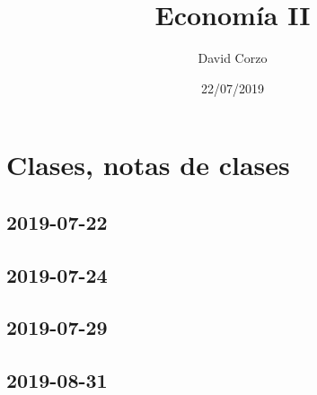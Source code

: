 \documentclass{book}
\author{David Corzo}
\date{22/07/2019}
\title{Economía II}
\begin{document}
\maketitle
\tableofcontents

\part{Clases, notas de clases}

\chapter{2019-07-22}


\chapter{2019-07-24}


\chapter{2019-07-29} 


\chapter{2019-08-31}


\chapter{}


\chapter{}


\chapter{}


\chapter{}


\chapter{}

\end{document}
